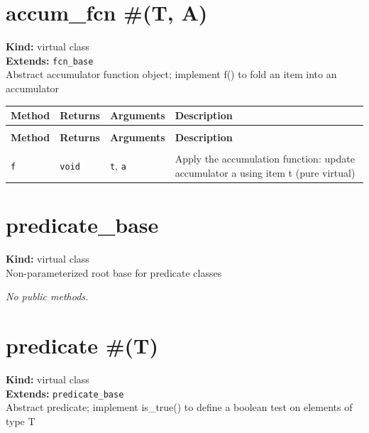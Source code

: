 \documentclass[11pt,letterpaper]{report}
\begin{document}
\section{accum\_fcn \#(T, A)}
\label{cls:accumfcnTA}

\noindent\textbf{Kind:} virtual class\\
\noindent\textbf{Extends:} \texttt{fcn\_base}\\
\noindent Abstract accumulator function object; implement f() to fold an item into an accumulator

\begin{xltabular}{\linewidth}{>{\small}p{1.35in} >{\small}p{1.25in} >{\small}p{0.95in} >{\small}X}
\toprule
\textbf{Method} & \textbf{Returns} & \textbf{Arguments} & \textbf{Description} \\
\midrule
\endfirsthead
{} \\
\midrule
\textbf{Method} & \textbf{Returns} & \textbf{Arguments} & \textbf{Description} \\
\midrule
\endhead
\midrule
{} \\
\endfoot
\bottomrule
\endlastfoot
\texttt{f} & \texttt{void} & \texttt{t}, \texttt{a} & Apply the accumulation function: update accumulator a using item t (pure virtual) \\
\end{xltabular}

\section{predicate\_base}
\label{cls:predicatebase}

\noindent\textbf{Kind:} virtual class\\
\noindent Non-parameterized root base for predicate classes

\noindent\textit{No public methods.}


\section{predicate \#(T)}
\label{cls:predicateT}

\noindent\textbf{Kind:} virtual class\\
\noindent\textbf{Extends:} \texttt{predicate\_base}\\
\noindent Abstract predicate; implement is\_true() to define a boolean test on elements of type T
\end{document}
